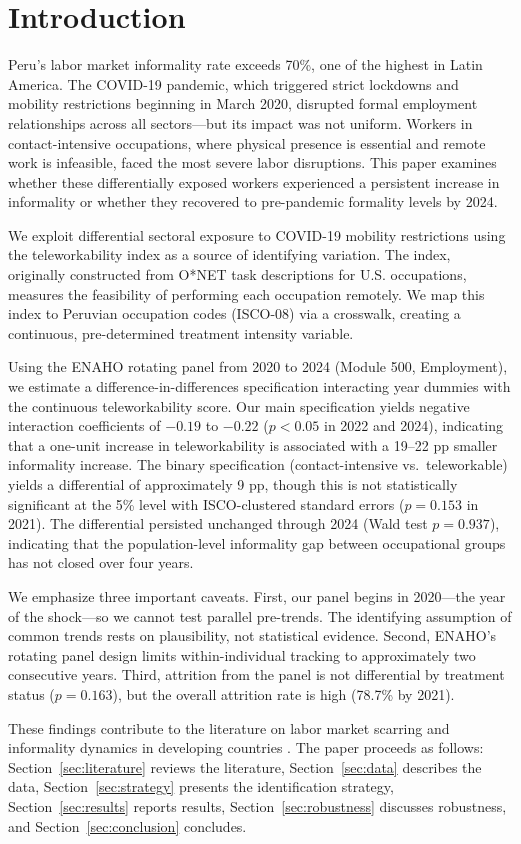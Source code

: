 \section{Introduction}
\label{sec:introduction}

Peru's labor market informality rate exceeds 70\%, one of the highest in Latin America. The COVID-19 pandemic, which triggered strict lockdowns and mobility restrictions beginning in March 2020, disrupted formal employment relationships across all sectors---but its impact was not uniform. Workers in contact-intensive occupations, where physical presence is essential and remote work is infeasible, faced the most severe labor disruptions. This paper examines whether these differentially exposed workers experienced a persistent increase in informality or whether they recovered to pre-pandemic formality levels by 2024.

We exploit differential sectoral exposure to COVID-19 mobility restrictions using the \citet{dingel2020} teleworkability index as a source of identifying variation. The index, originally constructed from O*NET task descriptions for U.S. occupations, measures the feasibility of performing each occupation remotely. We map this index to Peruvian occupation codes (ISCO-08) via a crosswalk, creating a continuous, pre-determined treatment intensity variable.

Using the ENAHO rotating panel from 2020 to 2024 (Module 500, Employment), we estimate a difference-in-differences specification interacting year dummies with the continuous teleworkability score. Our main specification yields negative interaction coefficients of $-0.19$ to $-0.22$ ($p < 0.05$ in 2022 and 2024), indicating that a one-unit increase in teleworkability is associated with a 19--22 pp smaller informality increase. The binary specification (contact-intensive vs.\ teleworkable) yields a differential of approximately 9 pp, though this is not statistically significant at the 5\% level with ISCO-clustered standard errors ($p = 0.153$ in 2021). The differential persisted unchanged through 2024 (Wald test $p = 0.937$), indicating that the population-level informality gap between occupational groups has not closed over four years.

We emphasize three important caveats. First, our panel begins in 2020---the year of the shock---so we cannot test parallel pre-trends. The identifying assumption of common trends rests on plausibility, not statistical evidence. Second, ENAHO's rotating panel design limits within-individual tracking to approximately two consecutive years. Third, attrition from the panel is not differential by treatment status ($p = 0.163$), but the overall attrition rate is high (78.7\% by 2021).

These findings contribute to the literature on labor market scarring \citep{arulampalam2001} and informality dynamics in developing countries \citep{bosch2025}. The paper proceeds as follows: Section~\ref{sec:literature} reviews the literature, Section~\ref{sec:data} describes the data, Section~\ref{sec:strategy} presents the identification strategy, Section~\ref{sec:results} reports results, Section~\ref{sec:robustness} discusses robustness, and Section~\ref{sec:conclusion} concludes.
